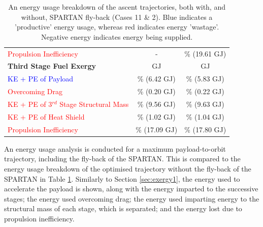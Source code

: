 \begin{table}[ht]
\begin{tabular}{l c c}
		\textcolor{red}{Propulsion Inefficiency}  
		& - & \PlossreturnCombinedStandard \% (19.61 GJ)
		\\
		
		
		\textbf{Third Stage Fuel Exergy}  
		& \textbf{\thirdEnergyStandardNoReturn} GJ & \textbf{\thirdEnergyStandard} GJ
		\\
		\textcolor{blue}{KE + PE of Payload}  
		&\thirddExergyEffStandardNoReturn \% (6.42 GJ) &\thirddExergyEffStandard \% (5.83 GJ)
		\\
		\textcolor{red}{Overcoming Drag}  
		& \WDthreeStandardNoReturn \% (0.20 GJ) & \WDthreeStandard \% (0.22 GJ)
		\\
		\textcolor{red}{KE + PE  of 3$^{rd}$ Stage Structural Mass}  
		& \WthreeStandardNoReturn \% (9.56 GJ) & \WthreeStandard \% (9.63 GJ)
		\\
		
		
		
		\textcolor{red}{KE + PE of Heat Shield}  
		
		& \WHSthreeStandardNoReturn \% (1.02 GJ) & \WHSthreeStandard \% (1.04 GJ)
		\\
		
		\textcolor{red}{Propulsion Inefficiency}  
		& \PlossthreeCombinedStandardNoReturn \% (17.09 GJ) & \PlossthreeCombinedStandard \% (17.80 GJ)
		\\
		\hline 
	\end{tabular} 
	\caption{An energy usage breakdown of the ascent trajectories, both with, and without, SPARTAN fly-back (Cases 11 \& 2). Blue indicates a 'productive' energy usage, whereas red indicates energy 'wastage'. Negative energy indicates energy being supplied.}
	\label{tab:effStandard}
\end{table}


An energy usage analysis is conducted for a maximum payload-to-orbit trajectory, including the fly-back of the SPARTAN. This is compared to the energy usage breakdown of the optimised trajectory without the fly-back of the SPARTAN in Table \ref{tab:effStandard}. Similarly to Section \ref{sec:exergy1}, the energy used to accelerate the payload is shown, along with the energy imparted to the successive stages; the energy used overcoming drag; the energy used imparting energy to the structural mass of each stage, which is separated; and the energy lost due to propulsion inefficiency. 


